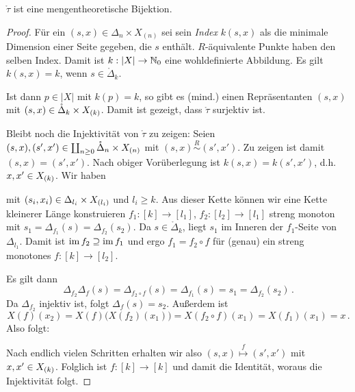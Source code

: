 \begin{prop}
  \label{prop:tau-bijektion}
  $\mathring\tau$ ist eine mengentheoretische Bijektion.
\end{prop}
\begin{proof}
  Für ein $(s,x) \in \Delta_n \times X_{(n)}$ sei sein \emph{Index} $k(s,x)$
  als die minimale Dimension einer Seite gegeben, die $s$ enthält.
  $R$-äquivalente Punkte haben den selben Index. Damit ist 
  $k: |X| \to \mathbb{N}_0$ eine wohldefinierte Abbildung.
  Es gilt $k(s,x) = k$, wenn $s \in \mathring\Delta_k$.
  
  Ist dann $p \in |X|$ mit $k(p) = k$, so gibt es (mind.) einen Repräsentanten
  $(s,x)$ mit $(s,x) \in \mathring\Delta_k \times X_{(k)}$.
  Damit ist gezeigt, dass $\mathring \tau$ surjektiv ist.

  Bleibt noch die Injektivität von $\mathring\tau$ zu zeigen:
  Seien $(s,x), (s',x') \in \coprod_{n\geq 0} \mathring\Delta_n \times X_{(n)}$ mit
  $(s,x) \overset R \sim (s',x')$. Zu zeigen ist damit $(s,x) = (s',x')$.
  Nach obiger Vorüberlegung ist $k(s,x) = k(s',x')$, d.h. 
  $x,x' \in X_{(k)}$.
  Wir haben 
  \begin{center}
  \end{center}
  mit $(s_i,x_i) \in \Delta_{l_i} \times X_{(l_i)}$ und $l_i \geq k$.
  Aus dieser Kette können wir eine Kette kleinerer Länge konstruieren
  $f_1: [k] \to [l_1]$, $f_2:[l_2]\to[l_1]$ streng monoton mit 
  $s_1 = \Delta_{f_1}(s) = \Delta_{f_2}(s_2)$.
  Da $s\in \mathring\Delta_k$, liegt $s_1$ im Inneren der $f_1$-Seite von
  $\Delta_{l_1}$.
  Damit ist $\operatorname{im} f_2 \supseteq \operatorname{im} f_1$ und ergo $f_1 = f_2 \circ f$ für 
  (genau) ein streng monotones $f: [k]\to[l_2]$.

  Es gilt dann 
  \[ \Delta_{f_2}\Delta_f(s) = \Delta_{f_2\circ f}(s) = 
    \Delta_{f_1}(s) = s_1 = \Delta_{f_2}(s_2)\,. \]
  Da $\Delta_{f_2}$ injektiv ist, folgt
  $\Delta_f(s) = s_2$. Außerdem ist
  \[ X(f)(x_2) = X(f)\big( X(f_2)(x_1) \big) = 
    X(f_2\circ f)(x_1) = X(f_1)(x_1) = x \,.\]
  Also folgt:
  \begin{center}
  \end{center}
  Nach endlich vielen Schritten erhalten wir also 
  $(s,x) \overset f \longmapsto (s',x')$ mit $x,x' \in X_{(k)}$. Folglich ist
  $f: [k] \to [k]$ und damit die Identität, woraus die Injektivität folgt.
\end{proof}


